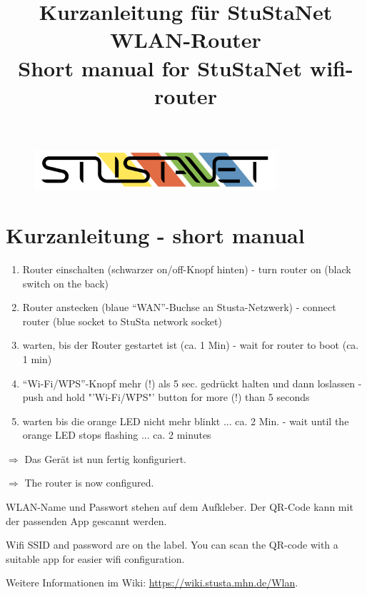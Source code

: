 \documentclass[a4paper,11pt]{scrartcl}
\title{Kurzanleitung für StuStaNet WLAN-Router\\Short manual for StuStaNet wifi-router}
\date{}
\begin{document}
\maketitle

\begin{figure}[t!]
   \centering
   \vspace{-20pt}
   \includegraphics[width=0.8\textwidth,keepaspectratio]{Bilder/StuStaNet_Logo}
   \vspace{-20pt}
\end{figure}


\section*{Kurzanleitung - short manual}

\begin{enumerate}
    \item Router einschalten (schwarzer on/off-Knopf hinten) - turn router on (black switch on the back)
    \item Router anstecken (blaue "`WAN"'-Buchse an Stusta-Netzwerk) - connect router (blue socket to StuSta network socket)
    \item warten, bis der Router gestartet ist (ca. 1 Min) - wait for router to boot (ca. 1 min)
    \item "`Wi-Fi/WPS"'-Knopf mehr (!) als 5 sec. gedrückt halten und dann loslassen - push and hold "'Wi-Fi/WPS"' button for more (!) than 5 seconds 
	\item warten bis die orange LED nicht mehr blinkt ... ca. 2 Min. - wait until the orange LED stops flashing ... ca. 2 minutes
\end{enumerate}

$\Rightarrow$ Das Gerät ist nun fertig konfiguriert.

$\Rightarrow$ The router is now configured.
\vspace{1em}

WLAN-Name und Passwort stehen auf dem Aufkleber. Der QR-Code kann mit der passenden App gescannt werden. 

Wifi SSID and password are on the label. You can scan the QR-code with a suitable app for easier wifi configuration.

Weitere Informationen im Wiki: \url{https://wiki.stusta.mhn.de/Wlan}.\\[1em]
\end{document}
